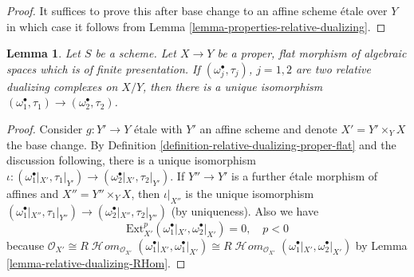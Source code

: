\documentclass[10pt,a4paper]{article}
\theoremstyle{plain}
\newtheorem{lemma}[subsection]{Lemma}
\theoremstyle{definition}
\theoremstyle{remark}
\numberwithin{equation}{subsection}
\def\SheafHom{\mathop{\mathcal{H}\!\mathit{om}}\nolimits}
\begin{document}
\begin{proof}
It suffices to prove this after base change to an affine scheme \'etale
over $Y$ in which case it follows from
Lemma \ref{lemma-properties-relative-dualizing}.
\end{proof}

\begin{lemma}
\label{lemma-uniqueness-relative-dualizing}
Let $S$ be a scheme. Let $X \to Y$ be a proper, flat morphism of
algebraic spaces which is of finite presentation.
If $(\omega_j^\bullet, \tau_j)$, $j = 1, 2$
are two relative dualizing complexes on $X/Y$,
then there is a unique isomorphism
$(\omega_1^\bullet, \tau_1) \to (\omega_2^\bullet, \tau_2)$.
\end{lemma}

\begin{proof}
Consider $g : Y' \to Y$ \'etale with $Y'$ an affine scheme
and denote $X' = Y' \times_Y X$ the base change.
By Definition \ref{definition-relative-dualizing-proper-flat}
and the discussion following, there is a unique isomorphism
$\iota : (\omega_1^\bullet|_{X'}, \tau_1|_{Y'}) \to
(\omega_2^\bullet|_{X'}, \tau_2|_{Y'})$. If $Y'' \to Y'$
is a further \'etale morphism of affines and $X'' = Y'' \times_Y X$,
then $\iota|_{X''}$ is the unique isomorphism
$(\omega_1^\bullet|_{X''}, \tau_1|_{Y''}) \to
(\omega_2^\bullet|_{X''}, \tau_2|_{Y''})$ (by uniqueness).
Also we have
$$
\text{Ext}^p_{X'}(\omega_1^\bullet|_{X'}, \omega_2^\bullet|_{X'}) = 0,
\quad p < 0
$$
because
$\mathcal{O}_{X'} \cong
R\SheafHom_{\mathcal{O}_{X'}}(\omega_1^\bullet|_{X'}, \omega_1^\bullet|_{X'})
\cong
R\SheafHom_{\mathcal{O}_{X'}}(\omega_1^\bullet|_{X'}, \omega_2^\bullet|_{X'})$
by Lemma \ref{lemma-relative-dualizing-RHom}.


\end{proof}
\end{document}
